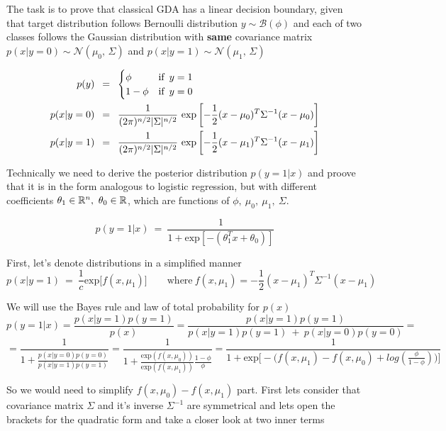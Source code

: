 \documentclass{article}
\begin{document}
The task is to prove that classical GDA has a linear decision boundary, given that target distribution follows Bernoulli distribution $ y \sim \mathcal{B}(\phi)$ and each of two classes follows the Gaussian distribution with {\bf same} covariance matrix $p(x | y = 0) \sim \mathcal{N}(\mu_0,\,\Sigma)$ and $p(x | y = 1) \sim \mathcal{N}(\mu_1,\,\Sigma)$

\begin{align}
	p(y) \enskip &= \enskip 
		\begin{cases}
			\phi & \text{if} \enskip y = 1 \\
			1 - \phi & \text{if} \enskip y = 0
		\end{cases} \\
	p(x | y = 0) \enskip &= \enskip
		\frac 1{(2\pi)^{n/2} |\Sigma|^{n/2}} \ \text{exp}
				\left[
					-\frac12 (x - \mu_0)^T \Sigma^{-1} (x - \mu_0)
				\right] \\
	p(x | y = 1) \enskip &= \enskip
		\frac 1{(2\pi)^{n/2} |\Sigma|^{n/2}} \ \text{exp}
				\left[
					-\frac12 (x - \mu_1)^T \Sigma^{-1} (x - \mu_1)
				\right]
\end{align}
\bigbreak

Technically we need to derive the posterior distribution $p(y = 1 | x)$ and proove that it is in the form analogous to logistic regression, but with different coefficients $\theta_1 \in {\Bbb R}^n, \ \theta_0 \in {\Bbb R}$, which are functions of $\phi,\ \mu_0,\ \mu_1,\ \Sigma $.

\[
	p(y = 1| x) \ = \ \frac1{1 + \text{exp}[-(\theta_1^T x + \theta_0)]}
\]
\bigbreak

First, let's denote distributions in a simplified manner
\[
	p(x | y = 1 ) \ =  \ \frac1{c} \text{exp} \big[ f(x, \mu_1) \big] \qquad \text{where} \ f(x, \mu_1) = -\frac12 (x - \mu_1)^T \Sigma^{-1} (x - \mu_1)
\]
\bigbreak

We will use the Bayes rule and law of total probability for $p(x)$
\[
p(y = 1| x) = 
\frac{p(x| y=1)p(y=1)} {p(x)} = 
\frac{p(x| y=1)p(y=1)} {p(x| y=1)p(y=1) \ + \ p(x| y=0)p(y=0)} =
\]
\[
=\frac1 {1 + \frac{p(x| y=0)p(y=0)}{p(x| y=1)p(y=1)}}
=\frac1 {1 + \frac{\text{exp} (f(x, \mu_0))}{\text{exp}(f(x, \mu_1))}\frac{1-\phi}{\phi}} 
=\frac1 {1 + \text{exp} \Big [-\Big (f(x, \mu_1) - f(x, \mu_0) + log(\frac{\phi}{1-\phi}) \Big) \Big ]}
\]
\bigbreak

So we would need to simplify $f(x, \mu_0) - f(x, \mu_1)$ part. First lets consider that covariance matrix $\Sigma$ and it's inverse $\Sigma^{-1}$ are symmetrical and lets open the brackets for the quadratic form and take a closer look at two inner terms
\end{document}
